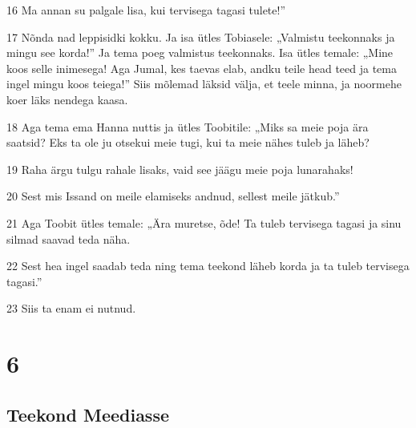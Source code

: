 \par 16 Ma annan su palgale lisa, kui tervisega tagasi tulete!”
\par 17 Nõnda nad leppisidki kokku. Ja isa ütles Tobiasele:  „Valmistu  teekonnaks ja mingu see korda!” Ja tema poeg valmistus teekonnaks.  Isa ütles temale: „Mine koos selle inimesega! Aga Jumal, kes taevas  elab, andku teile head teed ja tema ingel mingu koos teiega!” Siis  mõlemad läksid välja, et teele minna, ja noormehe koer läks nendega  kaasa.
\par 18 Aga tema ema Hanna nuttis ja ütles Toobitile: „Miks sa meie poja  ära saatsid? Eks ta ole ju otsekui meie tugi, kui ta meie nähes  tuleb ja läheb?
\par 19 Raha ärgu tulgu rahale lisaks, vaid see jäägu meie poja  lunarahaks!
\par 20 Sest mis Issand on meile elamiseks andnud, sellest meile  jätkub.”
\par 21 Aga Toobit ütles temale: „Ära muretse, õde! Ta tuleb tervisega  tagasi ja sinu silmad saavad teda näha.
\par 22 Sest hea ingel saadab teda ning tema teekond läheb korda ja ta  tuleb tervisega tagasi.”
\par 23 Siis ta enam ei nutnud.

\chapter{6}

\section*{Teekond Meediasse}

